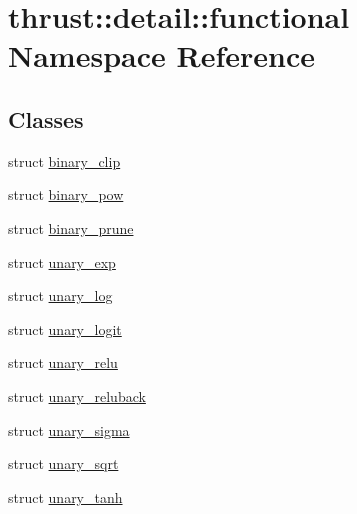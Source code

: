 \hypertarget{namespacethrust_1_1detail_1_1functional}{}\section{thrust\+:\+:detail\+:\+:functional Namespace Reference}
\label{namespacethrust_1_1detail_1_1functional}
\subsection*{Classes}
\begin{DoxyCompactItemize}
\item 
struct \hyperlink{structthrust_1_1detail_1_1functional_1_1binary__clip}{binary\+\_\+clip}
\item 
struct \hyperlink{structthrust_1_1detail_1_1functional_1_1binary__pow}{binary\+\_\+pow}
\item 
struct \hyperlink{structthrust_1_1detail_1_1functional_1_1binary__prune}{binary\+\_\+prune}
\item 
struct \hyperlink{structthrust_1_1detail_1_1functional_1_1unary__exp}{unary\+\_\+exp}
\item 
struct \hyperlink{structthrust_1_1detail_1_1functional_1_1unary__log}{unary\+\_\+log}
\item 
struct \hyperlink{structthrust_1_1detail_1_1functional_1_1unary__logit}{unary\+\_\+logit}
\item 
struct \hyperlink{structthrust_1_1detail_1_1functional_1_1unary__relu}{unary\+\_\+relu}
\item 
struct \hyperlink{structthrust_1_1detail_1_1functional_1_1unary__reluback}{unary\+\_\+reluback}
\item 
struct \hyperlink{structthrust_1_1detail_1_1functional_1_1unary__sigma}{unary\+\_\+sigma}
\item 
struct \hyperlink{structthrust_1_1detail_1_1functional_1_1unary__sqrt}{unary\+\_\+sqrt}
\item 
struct \hyperlink{structthrust_1_1detail_1_1functional_1_1unary__tanh}{unary\+\_\+tanh}
\end{DoxyCompactItemize}
